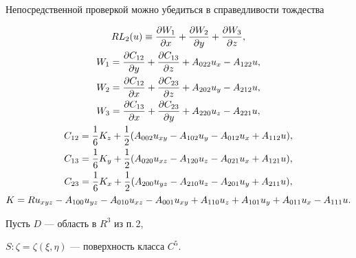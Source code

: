 Непосредственной проверкой можно убедиться в справедливости тождества


\begin{gather}\label{2-4}


RL_{2}(u)\equiv \frac{\partial W_1}{\partial x}


+\frac{\partial W_2}{\partial y}+\frac{\partial W_3}{\partial z},\\


%


W_1=\frac{\partial C_{12}}{\partial y}


+\frac{\partial C_{13}}{\partial z}+A_{022}u_{x}-A_{122}u,\notag \\


%


W_2=\frac{\partial C_{12}}{\partial x}


+\frac{\partial C_{23}}{\partial z}+A_{202}u_{y}-A_{212}u,\notag \\


%


W_3=\frac{\partial C_{13}}{\partial x}


+\frac{\partial C_{23}}{\partial y}+A_{220}u_{z}-A_{221}u,\notag \\


%


C_{12}=\frac{1}{6}K_{z}+\frac{1}{2}(A_{002}u_{xy}


-A_{102}u_{y}-A_{012}u_{x}+A_{112}u),\notag \\


%


C_{13}=\frac{1}{6}K_{y}+\frac{1}{2}(A_{020}u_{xz}-A_{120}u_{z}


-A_{021}u_{x}+A_{121}u),\notag \\


%


C_{23}=\frac{1}{6}K_{x}+\frac{1}{2}(A_{200}u_{yz}-A_{210}u_{z}


-A_{201}u_{y}+A_{211}u),\notag \\


K=Ru_{xyz}-A_{100}u_{yz}-A_{010}u_{xz}-A_{001}u_{xy}+


A_{110}u_{z}+A_{101}u_{y}+A_{011}u_{x}-A_{111}u.\notag 


\end{gather}





Пусть $D$ --- область в $R^3$ из п.\,2,


$S: \zeta=\zeta(\xi,\eta)$ --- поверхность класса $C^5$.





